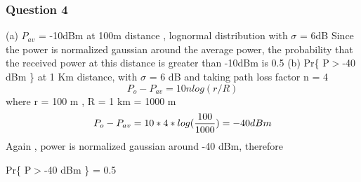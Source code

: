 \documentclass[12pt]{article}
\begin{document}
\subsubsection*{Question 4}
\vspace{5mm}
(a) \(P_{av}\) = -10dBm at 100m distance , lognormal  distribution with \(\sigma\) = 6dB
Since the power is normalized gaussian around the average power, the probability that the received power at this distance is greater than -10dBm is 0.5
\newline
\newline
(b) Pr\{ P\(>\)-40 dBm \} at 1 Km distance, with \(\sigma\) = 6 dB and taking path loss factor n = 4
\newline
\newline
\begin{equation*}
	P_o - P_{av} = 10nlog(r/R)
\end{equation*} 
\newline
where r  = 100 m , R = 1 km = 1000 m
\newline
\begin{equation*}
	P_o - P_{av} = 10*4*log({100\over1000}) = -40 dBm
\end{equation*}
\newline
\newline
Again , power is normalized gaussian around -40 dBm, therefore  

Pr\{ P\(>\)-40 dBm \} = 0.5
\newpage
\end{document}
